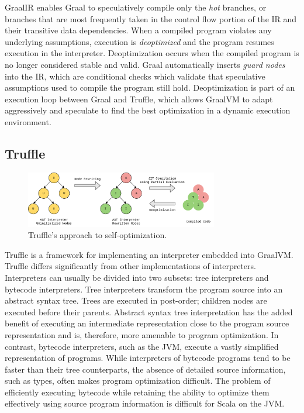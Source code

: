 GraalIR enables Graal to speculatively compile only the \textit{hot} branches\cite{graalvm:speculative-ir}, or branches that are most frequently taken in the control flow portion of the IR and their transitive data dependencies.
When a compiled program violates any underlying assumptions, execution is \textit{deoptimized}\cite{self:deoptimization} and the program resumes execution in the interpreter.
Deoptimization occurs when the compiled program is no longer considered stable and valid.
Graal automatically inserts \textit{guard nodes} into the IR, which are conditional checks which validate that speculative assumptions used to compile the program still hold.
Deoptimization is part of an execution loop between Graal and Truffle, which allows GraalVM to adapt aggressively and speculate to find the best optimization in a dynamic execution environment.

\subsection{Truffle}

\begin{figure}[!htb]
	\centering
	\includegraphics[width=0.75\textwidth]{figures/truffle-loop.png}
	\caption{Truffle's approach to self-optimization\cite{truffle:thesis}.}
	\label{diagram:graal-loop}
\end{figure}

Truffle is a framework for implementing an interpreter embedded into GraalVM.
Truffle differs significantly from other implementations of interpreters.
Interpreters can usually be divided into two subsets: tree interpreters and bytecode interpreters.
Tree interpreters transform the program source into an abstract syntax tree. 
Trees are executed in post-order; children nodes are executed before their parents.
Abstract syntax tree interpretation has the added benefit of executing an intermediate representation close to the program source representation and is, therefore, more amenable to program optimization.
In contrast, bytecode interpreters, such as the JVM, execute a vastly simplified representation of programs.
While interpreters of bytecode programs tend to be faster than their tree counterparts, the absence of detailed source information, such as types, often makes program optimization difficult.
The problem of efficiently executing bytecode while retaining the ability to optimize them effectively using source program information is difficult for Scala on the JVM. 

